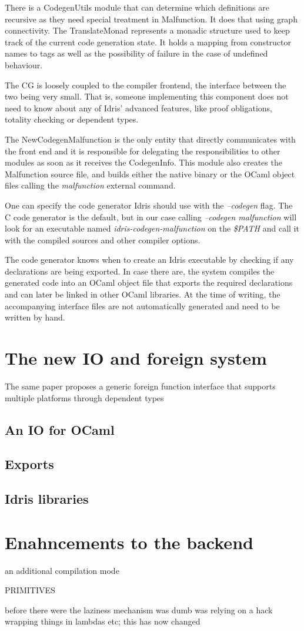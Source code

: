 There is a CodegenUtils module that can determine which
definitions are recursive as they need special treatment
in Malfunction. It does that using graph connectivity.
The TranslateMonad represents a monadic structure used
to keep track of the current code generation state.
It holds a mapping from constructor names to tags as well
as the possibility of failure in the case of undefined
behaviour.

The CG is loosely coupled to the compiler frontend,
the interface between the two being very small.
That is, someone implementing this component does not need
to know about any of Idris' advanced features, like proof
obligations, totality checking or dependent types.

The NewCodegenMalfunction is the only entity that directly
communicates with the front end and it is responsible for
delegating the responsibilities to other modules as
soon as it receives the CodegenInfo. This module also creates
the Malfunction source file, and builds either the native binary
or the OCaml object files calling the \emph{malfunction}
external command.

One can specify the code generator Idris should use with
the \emph{--codegen } flag.
The C code generator is the default, but in our case
calling \emph{--codegen malfunction} will look for an
executable named \emph{idris-codegen-malfunction} on the
\emph{\$PATH} and call it with the compiled sources and
other compiler options.

The code generator knows when to create an Idris executable
by checking if any declarations are being exported.
In case there are, the system compiles the generated code
into an OCaml object file that exports the required declarations
and can later be linked in other OCaml libraries. At the time
of writing, the accompanying interface files are not
automatically generated and need to be written by hand.



\section{The new IO and foreign system}
The same paper proposes a generic foreign function interface that
supports multiple platforms through dependent types
\subsection{An IO for OCaml}
\subsection{Exports}
\subsection{Idris libraries}
\section{Enahncements to the backend}
an additional compilation mode


PRIMITIVES


before there were the laziness mechanism was dumb was relying
on a hack wrapping things in lambdas etc; this has now changed